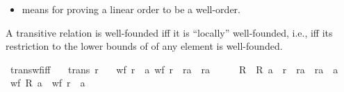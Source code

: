 \begin{isabellebody}
\begin{isamarkuptext}
\begin{itemize}
\item means for proving a linear order to be a well-order.%
\end{itemize}%
\end{isamarkuptext}\isamarkuptrue%
%
\isadelimdocument
%
\endisadelimdocument
%
\isatagdocument
%
\isamarkuptrue%
%
\endisatagdocument
{\isafolddocument}%
%
\isadelimdocument
%
\endisadelimdocument
%
\begin{isamarkuptext}%
A transitive relation is well-founded iff it is ``locally'' well-founded,
  i.e., iff its restriction to the lower bounds of of any element is
  well-founded.%
\end{isamarkuptext}\isamarkuptrue%
\isamarkupfalse%
\ trans{\isacharunderscore}{\kern0pt}wf{\isacharunderscore}{\kern0pt}iff{\isacharcolon}{\kern0pt}\isanewline
\ \ \ {\isachardoublequoteopen}trans\ r{\isachardoublequoteclose}\isanewline
\ \ \ {\isachardoublequoteopen}wf\ r\ {\isasymlongleftrightarrow}\ {\isacharparenleft}{\kern0pt}{\isasymforall}a{\isachardot}{\kern0pt}\ wf\ {\isacharparenleft}{\kern0pt}r\ {\isasyminter}\ {\isacharparenleft}{\kern0pt}r{\isasyminverse}{\isacharbackquote}{\kern0pt}{\isacharbackquote}{\kern0pt}{\isacharbraceleft}{\kern0pt}a{\isacharbraceright}{\kern0pt}\ {\isasymtimes}\ r{\isasyminverse}{\isacharbackquote}{\kern0pt}{\isacharbackquote}{\kern0pt}{\isacharbraceleft}{\kern0pt}a{\isacharbraceright}{\kern0pt}{\isacharparenright}{\kern0pt}{\isacharparenright}{\kern0pt}{\isacharparenright}{\kern0pt}{\isachardoublequoteclose}\isanewline
%
\isadelimproof
%
\endisadelimproof
%
\isatagproof
{}\isamarkupfalse%
\ {\isacharminus}{\kern0pt}\isanewline
\ \ \isamarkupfalse%
\ R\ \ {\isachardoublequoteopen}R\ a\ {\isacharequal}{\kern0pt}\ r\ {\isasyminter}\ {\isacharparenleft}{\kern0pt}r{\isasyminverse}{\isacharbackquote}{\kern0pt}{\isacharbackquote}{\kern0pt}{\isacharbraceleft}{\kern0pt}a{\isacharbraceright}{\kern0pt}\ {\isasymtimes}\ r{\isasyminverse}{\isacharbackquote}{\kern0pt}{\isacharbackquote}{\kern0pt}{\isacharbraceleft}{\kern0pt}a{\isacharbraceright}{\kern0pt}{\isacharparenright}{\kern0pt}{\isachardoublequoteclose}\ \ a\isanewline
\ \ \isamarkupfalse%
\ {\isachardoublequoteopen}wf\ {\isacharparenleft}{\kern0pt}R\ a{\isacharparenright}{\kern0pt}{\isachardoublequoteclose}\ \ {\isachardoublequoteopen}wf\ r{\isachardoublequoteclose}\ \ a\isanewline
\ \ \ \ \isamarkupfalse%

\end{isabellebody}

